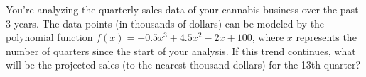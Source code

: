 \documentclass[border=10pt]{standalone}
\begin{document}
\begin{tcolorbox}[
    enhanced,
    colback=salesquestionbg,
    colframe=salesquestionborder,
    arc=8pt,
    boxrule=1.5pt,
    fontupper=\large\sffamily,
    width=0.95\textwidth
]
You're analyzing the quarterly sales data of your cannabis business over the past 3 years. The data points (in thousands of dollars) can be modeled by the polynomial function $f(x) = -0.5x^3 + 4.5x^2 - 2x + 100$, where $x$ represents the number of quarters since the start of your analysis. If this trend continues, what will be the projected sales (to the nearest thousand dollars) for the 13th quarter?
\end{tcolorbox}
\end{document}

